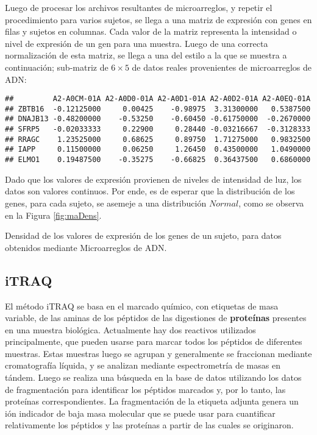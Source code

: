 \documentclass[12pt,twoside]{reedthesis}
\begin{document}
Luego de procesar los archivos resultantes de microarreglos, y repetir el procedimiento para varios sujetos, se llega a una matriz de expresión con genes en filas y sujetos en columnas. Cada valor de la matriz representa la intensidad o nivel de expresión de un gen para una muestra. Luego de una correcta normalización de esta matriz, se llega a una del estilo a la que se muestra a continuación; sub-matriz de \(6\times5\) de datos reales provenientes de microarreglos de ADN:

\newpage
\begin{verbatim}
##         A2-A0CM-01A A2-A0D0-01A A2-A0D1-01A A2-A0D2-01A A2-A0EQ-01A
## ZBTB16  -0.12125000     0.00425    -0.98975  3.31300000   0.5387500
## DNAJB13 -0.48200000    -0.53250    -0.60450 -0.61750000  -0.2670000
## SFRP5   -0.02033333     0.22900     0.28440 -0.03216667  -0.3128333
## RRAGC    1.23525000     0.68625     0.89750  1.71275000   0.9832500
## IAPP     0.11500000     0.06250     1.26450  0.43500000   1.0490000
## ELMO1    0.19487500    -0.35275    -0.66825  0.36437500   0.6860000
\end{verbatim}
Dado que los valores de expresión provienen de niveles de intensidad de luz, los datos son valores continuos. Por ende, es de esperar que la distribución de los genes, para cada sujeto, se asemeje a una distribución \(Normal\), como se observa en la Figura \ref{fig:maDens}.

Densidad de los valores de expresión de los genes de un sujeto, para datos obtenidos mediante Microarreglos de ADN.

\hypertarget{itraq}{%
\subsection{iTRAQ}\label{itraq}}

El método iTRAQ se basa en el marcado químico, con etiquetas de masa variable, de las aminas de los péptidos de las digestiones de \textbf{proteínas} presentes en una muestra biológica. Actualmente hay dos reactivos utilizados principalmente, que pueden usarse para marcar todos los péptidos de diferentes muestras. Estas muestras luego se agrupan y generalmente se fraccionan mediante cromatografía líquida, y se analizan mediante espectrometría de masas en tándem. Luego se realiza una búsqueda en la base de datos utilizando los datos de fragmentación para identificar los péptidos marcados y, por lo tanto, las proteínas correspondientes. La fragmentación de la etiqueta adjunta genera un ión indicador de baja masa molecular que se puede usar para cuantificar relativamente los péptidos y las proteínas a partir de las cuales se originaron.
\end{document}
